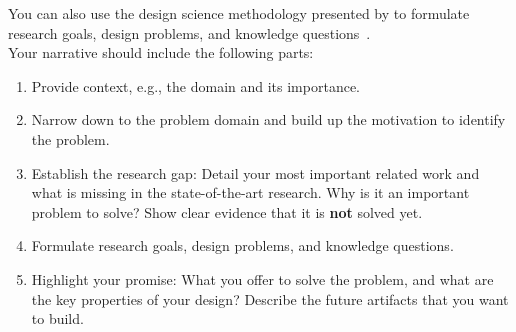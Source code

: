 \begin{tcolorbox}[breakable]
	You can also use the design science methodology presented by \citeauthor{wieringa2014design} to formulate research goals, design problems, and knowledge questions~\cite{wieringa2014design}.
	\\
	Your narrative should include the following parts:
	\begin{enumerate}
		\item Provide context, e.g., the domain and its importance.
		\item Narrow down to the problem domain and build up the motivation to identify the problem.
		\item Establish the research gap: Detail your most important related work and what is missing in the state-of-the-art research. Why is it an important problem to solve? Show clear evidence that it is \textbf{not} solved yet.
		\item Formulate research goals, design problems, and knowledge questions.
		\item Highlight your promise: What you offer to solve the problem, and what are the key properties of your design? Describe the future artifacts that you want to build.
	\end{enumerate}

\end{tcolorbox}
